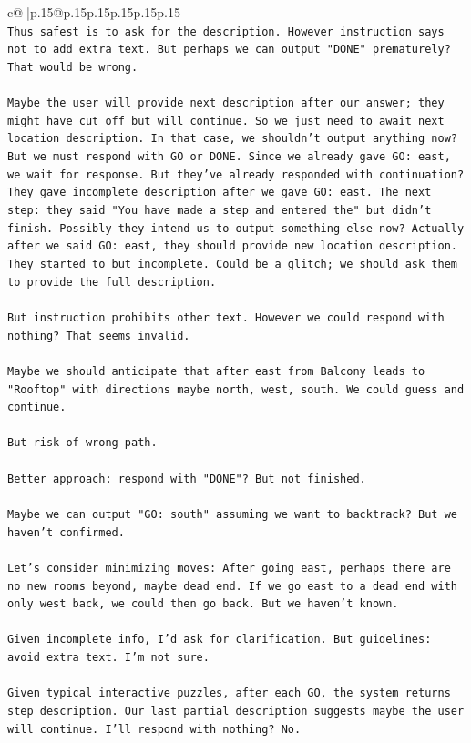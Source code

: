 \documentclass{article}
\begin{document}
{\begin{supertabular}{c@{$\;$}|p{.15\linewidth}@{}p{.15\linewidth}p{.15\linewidth}p{.15\linewidth}p{.15\linewidth}p{.15\linewidth}}
{{{\\ 
\texttt{Thus safest is to ask for the description. However instruction says not to add extra text. But perhaps we can output "DONE" prematurely? That would be wrong.} \\
\\ 
\texttt{Maybe the user will provide next description after our answer; they might have cut off but will continue. So we just need to await next location description. In that case, we shouldn't output anything now? But we must respond with GO or DONE. Since we already gave GO: east, we wait for response. But they've already responded with continuation? They gave incomplete description after we gave GO: east. The next step: they said "You have made a step and entered the" but didn't finish. Possibly they intend us to output something else now? Actually after we said GO: east, they should provide new location description. They started to but incomplete. Could be a glitch; we should ask them to provide the full description.} \\
\\ 
\texttt{But instruction prohibits other text. However we could respond with nothing? That seems invalid.} \\
\\ 
\texttt{Maybe we should anticipate that after east from Balcony leads to "Rooftop" with directions maybe north, west, south. We could guess and continue.} \\
\\ 
\texttt{But risk of wrong path.} \\
\\ 
\texttt{Better approach: respond with "DONE"? But not finished.} \\
\\ 
\texttt{Maybe we can output "GO: south" assuming we want to backtrack? But we haven't confirmed.} \\
\\ 
\texttt{Let's consider minimizing moves: After going east, perhaps there are no new rooms beyond, maybe dead end. If we go east to a dead end with only west back, we could then go back. But we haven't known.} \\
\\ 
\texttt{Given incomplete info, I'd ask for clarification. But guidelines: avoid extra text. I'm not sure.} \\
\\ 
\texttt{Given typical interactive puzzles, after each GO, the system returns step description. Our last partial description suggests maybe the user will continue. I'll respond with nothing? No.} \\
}}}
\end{supertabular}}
\end{document}
